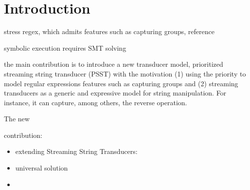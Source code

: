 
\section{Introduction}

stress regex, which admits features such as capturing groups, reference


symbolic execution requires SMT solving 

the main contribution is to introduce  a new transducer model, prioritized streaming string transducer (PSST) with the  motivation 
(1) using the priority to model regular expressions features such as capturing groups and (2) streaming transducers as a generic and expressive model for string manipulation. For instance, it can capture, among others, the reverse operation. 

The new 

contribution: 

\begin{itemize}
	\item extending Streaming String Transducers: \cite{FR17}
	
	\item  universal solution 
	
	\item 
\end{itemize} 
